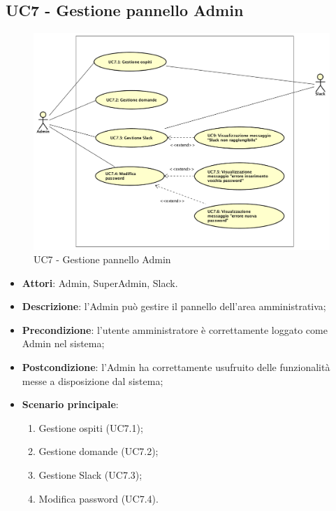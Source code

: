 \documentclass[../AnalisiDeiRequisiti_v4.0.0.tex]{subfiles}
\begin{document}
\subsection{UC7 - Gestione pannello Admin} 
\label{sssec:UC7} 
\begin{figure}[!h]
	\centering
	\includegraphics[width=\textwidth]{UseCases/UC7_GestionePannelloAdmin/UC7_GestionePannelloAdmin.png}
	\caption{UC7 - Gestione pannello Admin}
\end{figure}
\begin{itemize} 
\item \textbf{Attori}: Admin, SuperAdmin, Slack.
\item \textbf{Descrizione}: l'Admin può gestire il pannello dell'area amministrativa;
\item \textbf{Precondizione}: l'utente amministratore è correttamente loggato come Admin nel sistema;
\item \textbf{Postcondizione}: l'Admin ha correttamente usufruito delle funzionalità messe a disposizione dal sistema;
\item \textbf{Scenario principale}: \begin{enumerate}\item Gestione ospiti (UC7.1);\item Gestione domande (UC7.2);\item Gestione Slack (UC7.3);\item Modifica password (UC7.4). 
 \end{enumerate}
\end{itemize} 
\newpage
\end{document}
